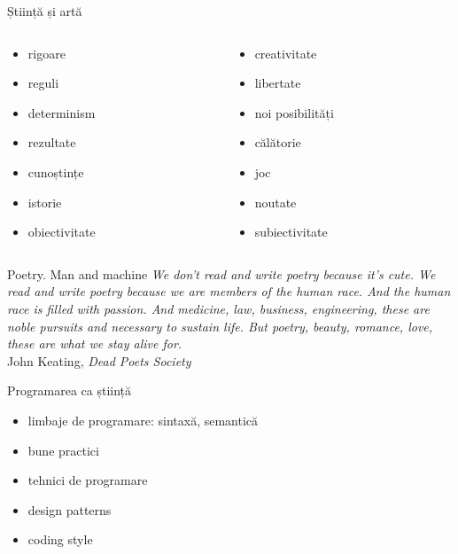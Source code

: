 \documentclass{simple}
\begin{document}
\begin{frame}{Știință și artă}
  \begin{columns}
    \begin{column}{0.5\textwidth}
      \begin{itemize}
        \item rigoare
        \item reguli
        \item determinism
        \item rezultate
        \item cunoștințe
        \item istorie
        \item obiectivitate
      \end{itemize}
    \end{column}
    \begin{column}{0.5\textwidth}
      \begin{itemize}
        \item creativitate
        \item libertate
        \item noi posibilități
        \item călătorie
        \item joc
        \item noutate
        \item subiectivitate
      \end{itemize}
    \end{column}
  \end{columns}
\end{frame}

\begin{frame}{Poetry. Man and machine}
  \textit{We don't read and write poetry because it's cute. We read and write poetry because we are members of the human race. And the human race is filled with passion. And medicine, law, business, engineering, these are noble pursuits and necessary to sustain life. But poetry, beauty, romance, love, these are what we stay alive for.}\\
  \vspace{0.5cm}
  \hfill{John Keating, \textit{Dead Poets Society}}
\end{frame}

\begin{frame}{Programarea ca știință}
  \begin{itemize}
    \pause
    \item limbaje de programare: sintaxă, semantică
    \item bune practici
    \item tehnici de programare
    \item design patterns
    \item coding style
  \end{itemize}
\end{frame}
\end{document}
